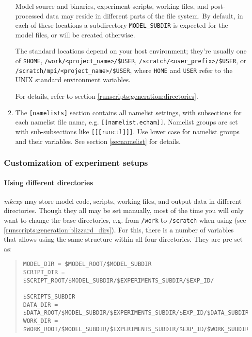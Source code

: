 \begin{enumerate}
Model source and binaries, experiment scripts, working files, and
post-processed data may reside in different parts of the file system. By
default, in each of these locations a subdirectory \texttt{MODEL\_SUBDIR} is
expected for the model files, or will be created otherwise.

The standard locations depend on your host environment; they're usually one of
\verb|$HOME|, \verb|/work/<project_name>/$USER|,
\verb|/scratch/<user_prefix>/$USER|, or
\verb|/scratch/mpi/<project_name>/$USER|, where \verb|HOME| and \verb|USER|
refer to the UNIX standard environment variables.

For details, refer to section \ref{runscripts:generation:directories}.

\item
The \verb|[namelists]| section contains all namelist settings, with subsections
for each namelist file name, e.g. \verb|[[namelist.echam]]|. Namelist groups
are set with sub-subsections like \verb|[[[runctl]]]|. Use lower case for
namelist groups and their variables. See section \ref{secnamelist} for details.

\end{enumerate}


\subsubsection{Customization of experiment setups}
\label{runscripts:generation:customization}

\paragraph*{Using different directories}
\label{runscripts:generation:directories}

\emph{mkexp} may store model code, scripts, working files, and
output data in different directories. Though they all may be set manually,
most of the time you will only want to change the base directories, e.g. from
\texttt{/work} to \texttt{/scratch} when using \blizzard{} (see
\ref{runscripts:generation:blizzard_dirs}). For this, there is a number of
variables that allows using the same structure within all four directories.
They are pre-set as:
%
\begin{quote}
\begin{verbatim}
MODEL_DIR = $MODEL_ROOT/$MODEL_SUBDIR
SCRIPT_DIR = $SCRIPT_ROOT/$MODEL_SUBDIR/$EXPERIMENTS_SUBDIR/$EXP_ID/
                                                             $SCRIPTS_SUBDIR
DATA_DIR = $DATA_ROOT/$MODEL_SUBDIR/$EXPERIMENTS_SUBDIR/$EXP_ID/$DATA_SUBDIR
WORK_DIR = $WORK_ROOT/$MODEL_SUBDIR/$EXPERIMENTS_SUBDIR/$EXP_ID/$WORK_SUBDIR
\end{verbatim}
\end{quote}

